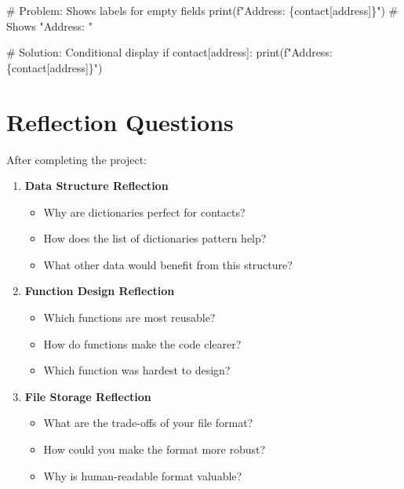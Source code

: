 \documentclass[
  letterpaper,
  DIV=11,
  numbers=noendperiod,
  oneside]{scrreprt}
\newenvironment{Shaded}{}{}
\newcommand{\BuiltInTok}[1]{\textcolor[rgb]{0.84,0.23,0.29}{#1}}
\newcommand{\CommentTok}[1]{\textcolor[rgb]{0.42,0.45,0.49}{#1}}
\newcommand{\ControlFlowTok}[1]{\textcolor[rgb]{0.84,0.23,0.29}{#1}}
\newcommand{\NormalTok}[1]{\textcolor[rgb]{0.14,0.16,0.18}{#1}}
\newcommand{\SpecialCharTok}[1]{\textcolor[rgb]{0.00,0.36,0.77}{#1}}
\newcommand{\SpecialStringTok}[1]{\textcolor[rgb]{0.01,0.18,0.38}{#1}}
\newcommand{\StringTok}[1]{\textcolor[rgb]{0.01,0.18,0.38}{#1}}
\providecommand{\tightlist}{%
  \setlength{\itemsep}{0pt}\setlength{\parskip}{0pt}}\usepackage{longtable,booktabs,array}
\begin{document}
\begin{Shaded}
\begin{Highlighting}[]
\CommentTok{\# Problem: Shows labels for empty fields}
\BuiltInTok{print}\NormalTok{(}\SpecialStringTok{f"Address: }\SpecialCharTok{\{}\NormalTok{contact[}\StringTok{\textquotesingle{}address\textquotesingle{}}\NormalTok{]}\SpecialCharTok{\}}\SpecialStringTok{"}\NormalTok{)  }\CommentTok{\# Shows "Address: "}

\CommentTok{\# Solution: Conditional display}
\ControlFlowTok{if}\NormalTok{ contact[}\StringTok{\textquotesingle{}address\textquotesingle{}}\NormalTok{]:}
    \BuiltInTok{print}\NormalTok{(}\SpecialStringTok{f"Address: }\SpecialCharTok{\{}\NormalTok{contact[}\StringTok{\textquotesingle{}address\textquotesingle{}}\NormalTok{]}\SpecialCharTok{\}}\SpecialStringTok{"}\NormalTok{)}
\end{Highlighting}
\end{Shaded}

\section{Reflection Questions}\label{reflection-questions-5}

After completing the project:

\begin{enumerate}
\def\labelenumi{\arabic{enumi}.}
\tightlist
\item
  \textbf{Data Structure Reflection}

  \begin{itemize}
  \tightlist
  \item
    Why are dictionaries perfect for contacts?
  \item
    How does the list of dictionaries pattern help?
  \item
    What other data would benefit from this structure?
  \end{itemize}
\item
  \textbf{Function Design Reflection}

  \begin{itemize}
  \tightlist
  \item
    Which functions are most reusable?
  \item
    How do functions make the code clearer?
  \item
    Which function was hardest to design?
  \end{itemize}
\item
  \textbf{File Storage Reflection}

  \begin{itemize}
  \tightlist
  \item
    What are the trade-offs of your file format?
  \item
    How could you make the format more robust?
  \item
    Why is human-readable format valuable?
  \end{itemize}
\end{enumerate}
\end{document}
